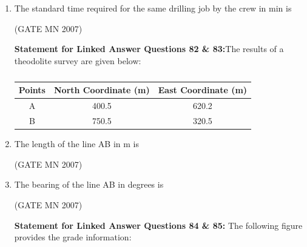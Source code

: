 \documentclass[journal]{IEEEtran}
\begin{document}
\begin{enumerate}
\item The standard time required for the same drilling job by the crew in min is

	\hfill (GATE MN 2007)
\begin{enumerate}
\end{enumerate}
\textbf{Statement for Linked Answer Questions 82 \& 83:}The results of a theodolite survey are given below:  

\begin{table}[H]
    \centering\normalsize
\begin{tabular}{|c|c|c|}
\hline
Points & North Coordinate (m) & East Coordinate (m) \\
\hline
A & 400.5 & 620.2 \\
\hline
B & 750.5 & 320.5 \\
\hline
\end{tabular}
    \caption{}
	\label{tab:Q82&Q83}
\end{table}
\item The length of the line AB in m is 


	\hfill (GATE MN 2007)
\begin{enumerate}
\end{enumerate}

\item The bearing of the line AB in degrees is  

	\hfill (GATE MN 2007)
\begin{enumerate}
\end{enumerate}
\textbf{Statement for Linked Answer Questions 84 \& 85:} The following figure provides the grade information:


\end{enumerate}
\end{document}
